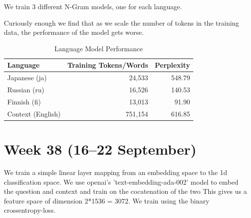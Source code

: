 \documentclass[11pt]{article}
\begin{document}
We train 3 different N-Gram models, one for each language.

Curiously enough we find that as we scale the number of tokens in the training data, the performance of the model gets worse.

\begin{table}[ht]
    \centering
    \begin{tabular}{|l|r|r|}
        \hline
        Language & Training Tokens/Words & Perplexity \\
        \hline
        Japanese (ja) & 24,533 & 548.79 \\
        Russian (ru) & 16,526 & 140.53 \\
        Finnish (fi) & 13,013 & 91.90 \\
        Context (English) & 751,154 & 616.85 \\
        \hline
    \end{tabular}
    \caption{Language Model Performance}
    \label{tab:language_model_performance}
\end{table}



\section{Week 38 (16--22 September)}

We train a simple linear layer mapping from an embedding space to the 1d classification space. We use openai's 'text-embedding-ada-002' model to embed the question and context and train on the cocatenation of the two 
This gives us a feature space of dimension 2*1536 = 3072. We train using the binary crossentropy-loss.
\end{document}
